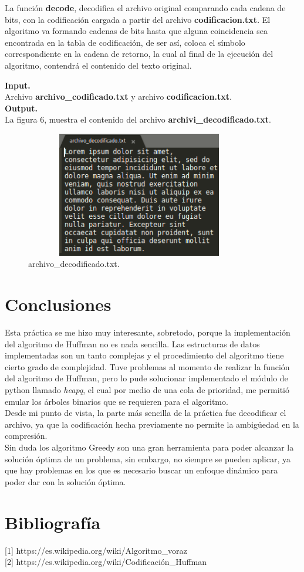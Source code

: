 \documentclass[12pt]{report}
\begin{document}
La función \textbf{decode}, decodifica el archivo original comparando cada cadena de bits, con la codificación cargada a partir del archivo \textbf{codificacion.txt}. El algoritmo va formando cadenas de bits hasta que alguna coincidencia sea encontrada en la tabla de codificación, de ser así, coloca el símbolo correspondiente en la cadena de retorno, la cual al final de la ejecución del algoritmo, contendrá el contenido del texto original.

\textbf{Input.}\\
Archivo \textbf{archivo\_codificado.txt} y archivo \textbf{codificacion.txt}.\\

\textbf{Output.}\\
La figura 6, muestra el contenido del archivo \textbf{archivi\_decodificado.txt}.\\
\begin{figure}[H]
	\includegraphics[width=10cm,height=5.5cm]{imagenes/6.png}
	\centering
	\caption{archivo\_decodificado.txt.}
	\centering
\end{figure}
	  
\newpage		
\section{Conclusiones}
Esta práctica se me hizo muy interesante, sobretodo, porque la implementación del algoritmo de Huffman no es nada sencilla. Las estructuras de datos implementadas son un tanto complejas y el procedimiento del algoritmo tiene cierto grado de complejidad. Tuve problemas al momento de realizar la función del algoritmo de Huffman, pero lo pude solucionar implementado el módulo de python llamado \textit{heapq}, el cual por medio de una cola de prioridad, me permitió emular los árboles binarios que se requieren para el algoritmo.\\
Desde mi punto de vista, la parte más sencilla de la práctica fue decodificar el archivo, ya que la codificación hecha previamente no permite la ambigüedad en la compresión.\\
Sin duda los algoritmo Greedy son una gran herramienta para poder alcanzar la solución óptima de un problema, sin embargo, no siempre se pueden aplicar, ya que hay problemas en los que es necesario buscar un enfoque dinámico para poder dar con la solución óptima.

\newpage

\section{Bibliografía}

[1] https://es.wikipedia.org/wiki/Algoritmo\_voraz\\

[2] https://es.wikipedia.org/wiki/Codificación\_Huffman\\
	
\end{document}
